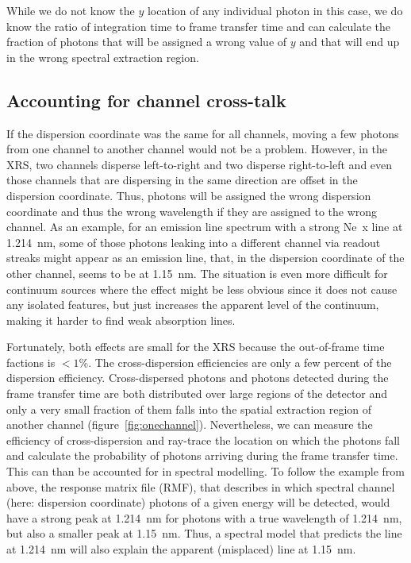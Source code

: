 \documentclass[12pt]{spieman}  %
\begin{document}
\begin{spacing}{2}
While we do not know the $y$ location of any individual photon in this case, we do know the ratio of integration time to frame transfer time and can calculate the fraction of photons that will be assigned a wrong value of $y$ and that will end up in the wrong spectral extraction region.

\subsection{Accounting for channel cross-talk}
If the dispersion coordinate was the same for all channels, moving a few photons from one channel to another channel would not be a problem. However, in the XRS, two channels disperse left-to-right and two disperse right-to-left and even those channels that are dispersing in the same direction are offset in the dispersion coordinate. Thus, photons will be assigned the wrong dispersion coordinate and thus the wrong wavelength if they are assigned to the wrong channel. As an example, for an emission line spectrum with a strong Ne~{\sc x} line at 1.214~nm, some of those photons leaking into a different channel via readout streaks might appear as an emission line, that, in the dispersion coordinate of the other channel, seems to be at 1.15~nm. The situation is even more difficult for continuum sources where the effect might be less obvious since it does not cause any isolated features, but just increases the apparent level of the continuum, making it harder to find weak absorption lines.

Fortunately, both effects are small for the XRS because the out-of-frame time factions is $<1$\%. The cross-dispersion efficiencies are only a few percent of the dispersion efficiency. Cross-dispersed photons and photons detected during the frame transfer time are both distributed over large regions of the detector and only a very small fraction of them falls into the spatial extraction region of another channel (figure~\ref{fig:onechannel}). Nevertheless, we can measure the efficiency of cross-dispersion and ray-trace the location on which the photons fall and calculate the probability of photons arriving during the frame transfer time. This can than be accounted for in spectral modelling. To follow the example from above, the response matrix file (RMF), that describes in which spectral channel (here: dispersion coordinate) photons of a given energy will be detected, would have a strong peak at 1.214~nm for photons with a true wavelength of 1.214~nm, but also a smaller peak at 1.15~nm. Thus, a spectral model that predicts the line at 1.214~nm will also explain the apparent (misplaced) line at 1.15~nm.




\end{spacing}
\end{document}
